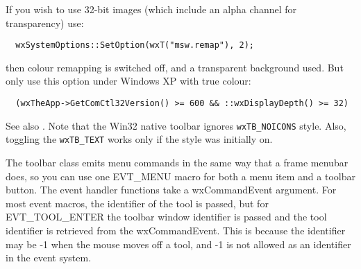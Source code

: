 If you wish to use 32-bit images (which include an alpha channel for transparency)
use:

\begin{verbatim}
  wxSystemOptions::SetOption(wxT("msw.remap"), 2);
\end{verbatim}

then colour remapping is switched off, and a transparent background used. But only
use this option under Windows XP with true colour:

\begin{verbatim}
  (wxTheApp->GetComCtl32Version() >= 600 && ::wxDisplayDepth() >= 32)
\end{verbatim}


\twocolwidtha{5cm}
\begin{twocollist}\itemsep=0pt
\end{twocollist}

See also . Note that the Win32
native toolbar ignores {\tt wxTB\_NOICONS} style. Also, toggling the 
{\tt wxTB\_TEXT} works only if the style was initially on.


The toolbar class emits menu commands in the same way that a frame menubar does,
so you can use one EVT\_MENU macro for both a menu item and a toolbar button.
The event handler functions take a wxCommandEvent argument. For most event macros,
the identifier of the tool is passed, but for EVT\_TOOL\_ENTER the toolbar
window identifier is passed and the tool identifier is retrieved from the wxCommandEvent.
This is because the identifier may be -1 when the mouse moves off a tool, and -1 is not
allowed as an identifier in the event system.

